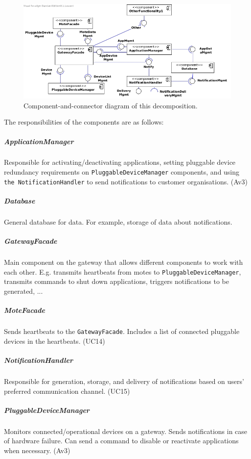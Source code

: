         \begin{figure}[!htp]
        	\centering
        	\includegraphics[width=1.00\textwidth]{images/component-diagram-1}
        	\caption{Component-and-connector diagram of this decomposition.}
            \label{fig:it1-cc_main}
        \end{figure}

        \noindent The responsibilities of the components are as follows:

    \subparagraph{ApplicationManager}
        Responsible for activating/deactivating applications, setting
        pluggable device redundancy requirements on \texttt{PluggableDeviceManager}
        components, and using \texttt{the NotificationHandler} to send notifications
        to customer organisations. (Av3)

    \subparagraph{Database}
        General database for data. For example, storage of data
        about notifications.

    \subparagraph{GatewayFacade}
        Main component on the gateway that allows different components to work
        with each other. E.g. transmits heartbeats from motes to
        \texttt{PluggableDeviceManager}, transmits commands to shut down applications,
        triggers notifications to be generated, ...

    \subparagraph{MoteFacade}
        Sends heartbeats to the \texttt{GatewayFacade}. Includes a list
        of connected pluggable devices in the heartbeats. (UC14)

    \subparagraph{NotificationHandler}
        Responsible for generation, storage, and delivery of notifications
        based on users' preferred communication channel. (UC15)

    \subparagraph{PluggableDeviceManager}
        Monitors connected/operational devices on a gateway. Sends notifications
        in case of hardware failure. Can send a command to disable or reactivate
        applications when necessary. (Av3)

